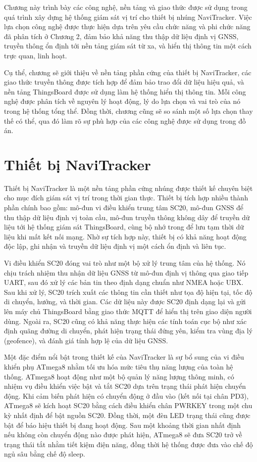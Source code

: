 \documentclass[../DoAn.tex]{subfiles}
\begin{document}
Chương này trình bày các công nghệ, nền tảng và giao thức được sử dụng trong quá trình xây dựng hệ thống giám sát vị trí cho thiết bị nhúng NaviTracker. Việc lựa chọn công nghệ được thực hiện dựa trên yêu cầu chức năng và phi chức năng đã phân tích ở Chương 2, đảm bảo khả năng thu thập dữ liệu định vị GNSS, truyền thông ổn định tới nền tảng giám sát từ xa, và hiển thị thông tin một cách trực quan, linh hoạt.

Cụ thể, chương sẽ giới thiệu về nền tảng phần cứng của thiết bị NaviTracker, các giao thức truyền thông được tích hợp để đảm bảo trao đổi dữ liệu hiệu quả, và nền tảng ThingsBoard được sử dụng làm hệ thống hiển thị thông tin. Mỗi công nghệ được phân tích về nguyên lý hoạt động, lý do lựa chọn và vai trò của nó trong hệ thống tổng thể. Đồng thời, chương cũng sẽ so sánh một số lựa chọn thay thế có thể, qua đó làm rõ sự phù hợp của các công nghệ được sử dụng trong đồ án.
\section{Thiết bị NaviTracker}
\label{section:3.1}
Thiết bị NaviTracker là một nền tảng phần cứng nhúng được thiết kế chuyên biệt cho mục đích giám sát vị trí trong thời gian thực. Thiết bị tích hợp nhiều thành phần chính bao gồm: mô-đun vi điều khiển trung tâm SC20, mô-đun GNSS để thu thập dữ liệu định vị toàn cầu, mô-đun truyền thông không dây để truyền dữ liệu tới hệ thống giám sát ThingsBoard, cùng bộ nhớ trong để lưu tạm thời dữ liệu khi mất kết nối mạng. Nhờ sự tích hợp này, thiết bị có khả năng hoạt động độc lập, ghi nhận và truyền dữ liệu định vị một cách ổn định và liên tục.

Vi điều khiển SC20 đóng vai trò như một bộ xử lý trung tâm của hệ thống. Nó chịu trách nhiệm thu nhận dữ liệu GNSS từ mô-đun định vị thông qua giao tiếp UART, sau đó xử lý các bản tin theo định dạng chuẩn như NMEA hoặc UBX. Sau khi xử lý, SC20 trích xuất các thông tin cần thiết như tọa độ hiện tại, tốc độ di chuyển, hướng, và thời gian. Các dữ liệu này được SC20 định dạng lại và gửi lên máy chủ ThingsBoard bằng giao thức MQTT để hiển thị trên giao diện người dùng. Ngoài ra, SC20 cũng có khả năng thực hiện các tính toán cục bộ như xác định quãng đường di chuyển, phát hiện trạng thái đứng yên, kiểm tra vùng địa lý (geofence), và đánh giá tính hợp lệ của dữ liệu GNSS.

Một đặc điểm nổi bật trong thiết kế của NaviTracker là sự bổ sung của vi điều khiển phụ ATmega8 nhằm tối ưu hóa mức tiêu thụ năng lượng của toàn hệ thống. ATmega8 hoạt động như một bộ quản lý năng lượng thông minh, có nhiệm vụ điều khiển việc bật và tắt SC20 dựa trên trạng thái phát hiện chuyển động. Khi cảm biến phát hiện có chuyển động ở đầu vào (kết nối tại chân PD3), ATmega8 sẽ kích hoạt SC20 bằng cách điều khiển chân PWRKEY trong một chu kỳ nhất định để bật nguồn SC20. Đồng thời, một đèn LED trạng thái cũng được bật để báo hiệu thiết bị đang hoạt động. Sau một khoảng thời gian nhất định nếu không còn chuyển động nào được phát hiện, ATmega8 sẽ đưa SC20 trở về trạng thái tắt nhằm tiết kiệm điện năng, đồng thời hệ thống được đưa vào chế độ ngủ sâu bằng chế độ sleep.
\end{document}
